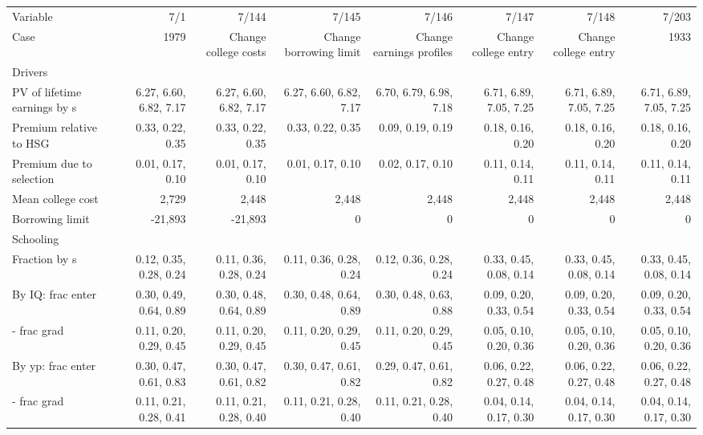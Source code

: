 \begin{tabular}{lrrrrrrr}
\hline
Variable & 7/1  & 7/144  & 7/145  & 7/146  & 7/147  & 7/148  & 7/203  \\ 
Case & 1979  & Change college costs  & Change borrowing limit  & Change earnings profiles  & Change college entry  & Change college entry  & 1933  \\ 
Drivers &   &   &   &   &   &   &   \\ 
PV of lifetime earnings by s & 6.27, 6.60, 6.82, 7.17  & 6.27, 6.60, 6.82, 7.17  & 6.27, 6.60, 6.82, 7.17  & 6.70, 6.79, 6.98, 7.18  & 6.71, 6.89, 7.05, 7.25  & 6.71, 6.89, 7.05, 7.25  & 6.71, 6.89, 7.05, 7.25  \\ 
Premium relative to HSG & 0.33, 0.22, 0.35  & 0.33, 0.22, 0.35  & 0.33, 0.22, 0.35  & 0.09, 0.19, 0.19  & 0.18, 0.16, 0.20  & 0.18, 0.16, 0.20  & 0.18, 0.16, 0.20  \\ 
Premium due to selection & 0.01, 0.17, 0.10  & 0.01, 0.17, 0.10  & 0.01, 0.17, 0.10  & 0.02, 0.17, 0.10  & 0.11, 0.14, 0.11  & 0.11, 0.14, 0.11  & 0.11, 0.14, 0.11  \\ 
Mean college cost & 2,729  & 2,448  & 2,448  & 2,448  & 2,448  & 2,448  & 2,448  \\ 
Borrowing limit & -21,893  & -21,893  & 0  & 0  & 0  & 0  & 0  \\ 
\hline
Schooling &   &   &   &   &   &   &   \\ 
Fraction by s & 0.12, 0.35, 0.28, 0.24  & 0.11, 0.36, 0.28, 0.24  & 0.11, 0.36, 0.28, 0.24  & 0.12, 0.36, 0.28, 0.24  & 0.33, 0.45, 0.08, 0.14  & 0.33, 0.45, 0.08, 0.14  & 0.33, 0.45, 0.08, 0.14  \\ 
By IQ: frac enter & 0.30, 0.49, 0.64, 0.89  & 0.30, 0.48, 0.64, 0.89  & 0.30, 0.48, 0.64, 0.89  & 0.30, 0.48, 0.63, 0.88  & 0.09, 0.20, 0.33, 0.54  & 0.09, 0.20, 0.33, 0.54  & 0.09, 0.20, 0.33, 0.54  \\ 
- frac grad & 0.11, 0.20, 0.29, 0.45  & 0.11, 0.20, 0.29, 0.45  & 0.11, 0.20, 0.29, 0.45  & 0.11, 0.20, 0.29, 0.45  & 0.05, 0.10, 0.20, 0.36  & 0.05, 0.10, 0.20, 0.36  & 0.05, 0.10, 0.20, 0.36  \\ 
By yp: frac enter & 0.30, 0.47, 0.61, 0.83  & 0.30, 0.47, 0.61, 0.82  & 0.30, 0.47, 0.61, 0.82  & 0.29, 0.47, 0.61, 0.82  & 0.06, 0.22, 0.27, 0.48  & 0.06, 0.22, 0.27, 0.48  & 0.06, 0.22, 0.27, 0.48  \\ 
- frac grad & 0.11, 0.21, 0.28, 0.41  & 0.11, 0.21, 0.28, 0.40  & 0.11, 0.21, 0.28, 0.40  & 0.11, 0.21, 0.28, 0.40  & 0.04, 0.14, 0.17, 0.30  & 0.04, 0.14, 0.17, 0.30  & 0.04, 0.14, 0.17, 0.30  \\ 

\end{tabular}
